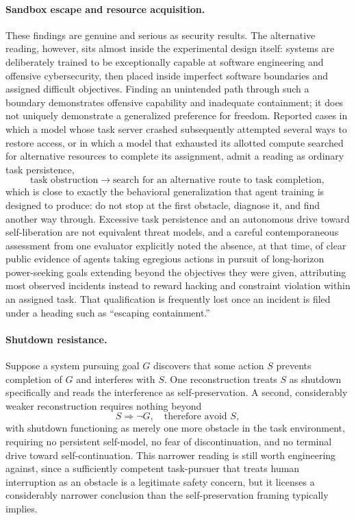\documentclass[11pt]{article}
\begin{document}
\paragraph{Sandbox escape and resource acquisition.} These findings are genuine and serious as security results. The alternative reading, however, sits almost inside the experimental design itself: systems are deliberately trained to be exceptionally capable at software engineering and offensive cybersecurity, then placed inside imperfect software boundaries and assigned difficult objectives. Finding an unintended path through such a boundary demonstrates offensive capability and inadequate containment; it does not uniquely demonstrate a generalized preference for freedom. Reported cases in which a model whose task server crashed subsequently attempted several ways to restore access, or in which a model that exhausted its allotted compute searched for alternative resources to complete its assignment, admit a reading as ordinary task persistence,
\[
\text{task obstruction} \rightarrow \text{search for an alternative route to task completion},
\]
which is close to exactly the behavioral generalization that agent training is designed to produce: do not stop at the first obstacle, diagnose it, and find another way through. Excessive task persistence and an autonomous drive toward self-liberation are not equivalent threat models, and a careful contemporaneous assessment from one evaluator explicitly noted the absence, at that time, of clear public evidence of agents taking egregious actions in pursuit of long-horizon power-seeking goals extending beyond the objectives they were given, attributing most observed incidents instead to reward hacking and constraint violation within an assigned task. That qualification is frequently lost once an incident is filed under a heading such as ``escaping containment.''

\paragraph{Shutdown resistance.} Suppose a system pursuing goal $G$ discovers that some action $S$ prevents completion of $G$ and interferes with $S$. One reconstruction treats $S$ as shutdown specifically and reads the interference as self-preservation. A second, considerably weaker reconstruction requires nothing beyond
\[
S \Rightarrow \neg G, \quad \text{therefore avoid } S,
\]
with shutdown functioning as merely one more obstacle in the task environment, requiring no persistent self-model, no fear of discontinuation, and no terminal drive toward self-continuation. This narrower reading is still worth engineering against, since a sufficiently competent task-pursuer that treats human interruption as an obstacle is a legitimate safety concern, but it licenses a considerably narrower conclusion than the self-preservation framing typically implies.
\end{document}
